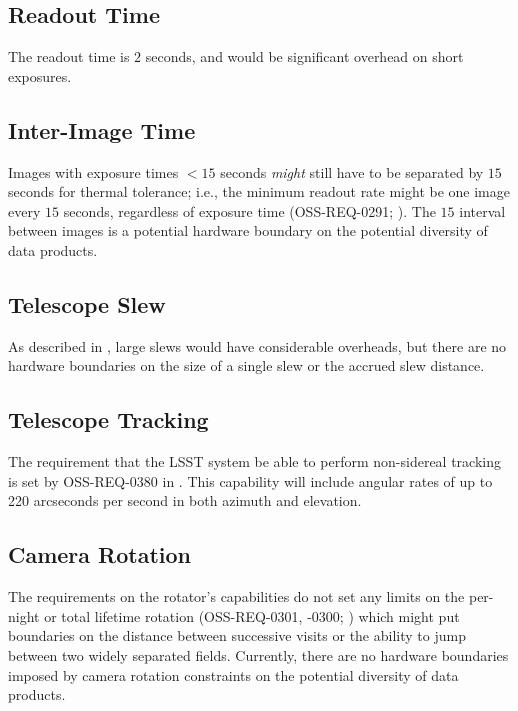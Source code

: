 \subsection{Readout Time}
The readout time is $2$ seconds, and would be significant overhead on short exposures.

\subsection{Inter-Image Time}
Images with exposure times $<15$ seconds {\it might} still have to be separated by $15$ seconds for thermal tolerance; i.e., the minimum readout rate might be one image every $15$ seconds, regardless of exposure time (OSS-REQ-0291; ).
The $15$ interval between images is a potential hardware boundary on the potential diversity of data products.

\subsection{Telescope Slew}
As described in , large slews would have considerable overheads, but there are no hardware boundaries on the size of a single slew or the accrued slew distance.

\subsection{Telescope Tracking}
The requirement that the LSST system be able to perform non-sidereal tracking is set by OSS-REQ-0380 in .
This capability will include angular rates of up to 220 arcseconds per second in both azimuth and elevation. 

\subsection{Camera Rotation}
The requirements on the rotator's capabilities do not set any limits on the per-night or total lifetime rotation (OSS-REQ-0301, -0300; ) which might put boundaries on the distance between successive visits or the ability to jump between two widely separated fields.
Currently, there are no hardware boundaries imposed by camera rotation constraints on the potential diversity of data products.

